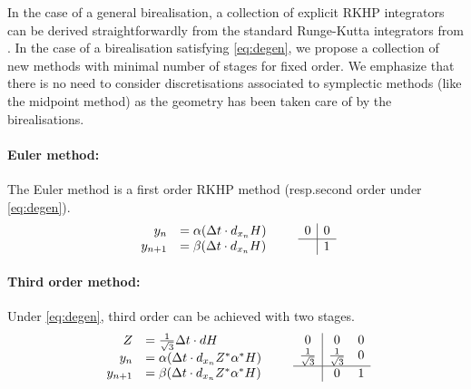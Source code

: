 \documentclass[a4paper,11pt]{article}
\newcommand{\OC}[1]{{ \framebox{OC:}~#1~\framebox{:OC}}}
\def\ts{\thinspace}
\begin{document}
In the case of a general birealisation, a collection of explicit RKHP integrators can be derived straightforwardly from the standard Runge-Kutta integrators from \cite{Hairer06gni}.
In the case of a birealisation satisfying \eqref{eq:degen}, we propose a collection of new methods with minimal number of stages for fixed order. %
We emphasize that there is no need to consider discretisations associated to symplectic methods (like the midpoint method) as the geometry has been taken care of by the birealisations. 


\paragraph*{Euler method:}
The Euler method is a first order RKHP method (resp.\ts second order under \eqref{eq:degen}).
\[
 \begin{array}{rl}
y_n &= \alpha(\Delta t \cdot d_{x_n} H)\\
y_{n+1} &= \beta(\Delta t \cdot d_{x_n} H) 
  \end{array}
\quad\quad
  \begin{array}{c|c}
    0 & 0 \\
    \hline
     & 1
  \end{array}
\]



\paragraph*{Third order method:}
Under \eqref{eq:degen}, third order can be achieved with two stages.
\[
 \begin{array}{rl}
 Z&=\frac{1}{\sqrt{3}}\Delta t \cdot d H \\
y_n &= \alpha(\Delta t \cdot d_{x_n} Z^*\alpha^* H)\\
y_{n+1} &= \beta(\Delta t \cdot d_{x_n} Z^*\alpha^* H) 
  \end{array}
\quad
\quad
\begin{array}{c|cc}
    0 & 0 & 0 \\
    \frac{1}{\sqrt{3}} & \frac{1}{\sqrt{3}} & 0 \\
    \hline
     & 0 & 1
\end{array}
\]
\end{document}
